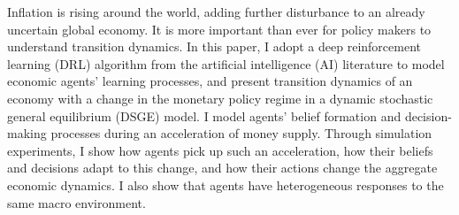 \documentclass[hidelinks]{article}
\begin{document}



Inflation is rising around the world, adding further disturbance to an already uncertain global economy. It is more important than ever for policy makers to understand transition dynamics. In this paper, I adopt a deep reinforcement learning (DRL) algorithm from the artificial intelligence (AI) literature to model economic agents' learning processes, and present transition dynamics of an economy with a change in the monetary policy regime in a dynamic stochastic general equilibrium (DSGE) model. I model agents' belief formation and decision-making processes during an acceleration of money supply. Through simulation experiments, I show how agents pick up such an acceleration, how their beliefs and decisions adapt to this change, and how their actions change the aggregate economic dynamics. I also show that agents have heterogeneous responses to the same macro environment. 


\end{document}
